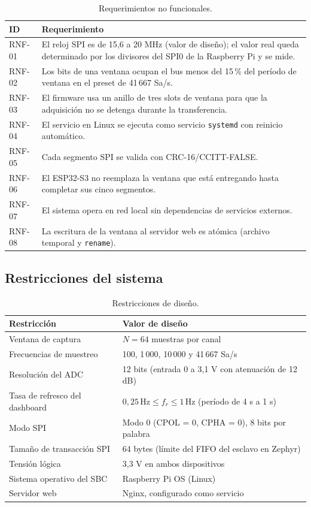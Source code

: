 \documentclass[12pt,a4paper]{article}
\begin{document}
\begin{table}[H]
\centering
\small
\begin{tabular}{@{}p{1.6cm} p{10.5cm}@{}}
\toprule
\textbf{ID} & \textbf{Requerimiento} \\
\midrule
RNF-01 & El reloj SPI es de 15{,}6 a 20 MHz (valor de diseño); el valor real queda determinado por los divisores del SPI0 de la Raspberry Pi y se mide. \\
RNF-02 & Los bits de una ventana ocupan el bus menos del 15\,\% del período de ventana en el preset de 41\,667 Sa/s. \\
RNF-03 & El firmware usa un anillo de tres slots de ventana para que la adquisición no se detenga durante la transferencia. \\
RNF-04 & El servicio en Linux se ejecuta como servicio \texttt{systemd} con reinicio automático. \\
RNF-05 & Cada segmento SPI se valida con CRC-16/CCITT-FALSE. \\
RNF-06 & El ESP32-S3 no reemplaza la ventana que está entregando hasta completar sus cinco segmentos. \\
RNF-07 & El sistema opera en red local sin dependencias de servicios externos. \\
RNF-08 & La escritura de la ventana al servidor web es atómica (archivo temporal y \texttt{rename}). \\
\bottomrule
\end{tabular}
\caption{Requerimientos no funcionales.}
\end{table}

\subsection{Restricciones del sistema}

\begin{table}[H]
\centering
\small
\begin{tabular}{@{}p{4.0cm} p{8.3cm}@{}}
\toprule
\textbf{Restricción} & \textbf{Valor de diseño} \\
\midrule
Ventana de captura & $N = 64$ muestras por canal \\
Frecuencias de muestreo & 100, 1\,000, 10\,000 y 41\,667 Sa/s \\
Resolución del ADC & 12 bits (entrada 0 a 3{,}1 V con atenuación de 12 dB) \\
Tasa de refresco del dashboard & $0{,}25\,\text{Hz} \leq f_r \leq 1\,\text{Hz}$ (período de 4 s a 1 s) \\
Modo SPI & Modo 0 (CPOL = 0, CPHA = 0), 8 bits por palabra \\
Tamaño de transacción SPI & 64 bytes (límite del FIFO del esclavo en Zephyr) \\
Tensión lógica & 3{,}3 V en ambos dispositivos \\
Sistema operativo del SBC & Raspberry Pi OS (Linux) \\
Servidor web & Nginx, configurado como servicio \\
\bottomrule
\end{tabular}
\caption{Restricciones de diseño.}
\end{table}
\end{document}
